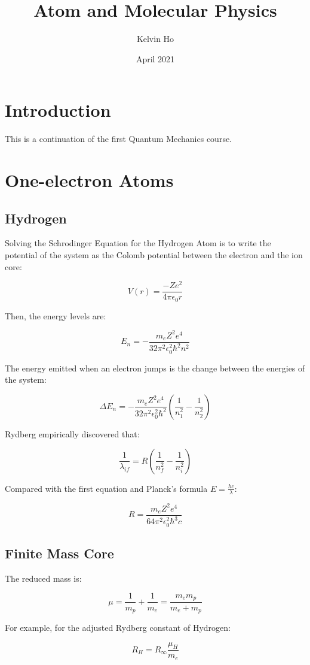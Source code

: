 \documentclass[12pt]{article}
\title{Atom and Molecular Physics}
\author{Kelvin Ho}
\date{April 2021}
\begin{document}
\maketitle

\section{Introduction}
This is a continuation of the first Quantum Mechanics course.

\section{One-electron Atoms}

\subsection{Hydrogen}

Solving the Schrodinger Equation for the Hydrogen Atom is to write the potential of the system as the Colomb potential between the electron and the ion core:

\[V(r) = \frac{-Ze^2}{4\pi\epsilon_0r}\]

Then, the energy levels are:

\[ E_n = -\frac{m_eZ^2e^4}{32\pi^2\epsilon_0^2\hbar^2n^2}\]

The energy emitted when an electron jumps is the change between the energies of the system:

\[\Delta E_n = -\frac{m_eZ^2e^4}{32\pi^2\epsilon_0^2\hbar^2}\left(\frac{1}{n_1^2} - \frac{1}{n_2^2}\right)\]

Rydberg empirically discovered that:

\[\frac{1}{\lambda_{if}} = R\left(\frac{1}{n_f^2} - \frac{1}{n_i^2}\right)\]

Compared with the first equation and Planck's formula $E = \frac{hc}{\lambda}$:

\[ R = \frac{m_eZ^2e^4}{64\pi^2\epsilon_0^2\hbar^3c}\]


\subsection{Finite Mass Core}
The reduced mass is:

\[\mu = \frac{1}{m_p} + \frac{1}{m_e} = \frac{m_e m_p}{m_e + m_p}\]

For example, for the adjusted Rydberg constant of Hydrogen:

\[ R_H = R_\infty \frac{\mu_H}{m_e}\]
\end{document}
